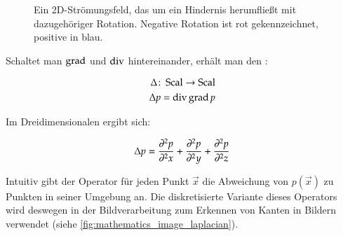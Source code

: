 \begin{figure}
\begin{subfigure}[b]{0.5\textwidth}
	\end{subfigure}
	\caption{Ein 2D-Strömungsfeld, das um ein Hindernis herumfließt mit dazugehöriger Rotation. Negative Rotation ist rot gekennzeichnet, positive in blau.}
    \label{fig:mathematics_rotation_example}
\end{figure}

Schaltet man $\operatorname*{grad}$ und $\operatorname*{div}$ hintereinander, erhält man den
:

\begin{equation}
\begin{aligned}
\Delta \colon \operatorname*{Scal} \to \operatorname*{Scal} \\
\Delta p = \operatorname*{div} \operatorname*{grad} p
\end{aligned}
\end{equation}

Im Dreidimensionalen ergibt sich:

\begin{equation}
\Delta p =
\frac{\partial^2 p}{\partial^2 x} +
\frac{\partial^2 p}{\partial^2 y} +
\frac{\partial^2 p}{\partial^2 z}
\end{equation}

Intuitiv gibt der Operator für jeden Punkt $\vec{x}$ die Abweichung von
$p(\vec{x})$ zu Punkten in seiner Umgebung an. Die diskretisierte Variante dieses
Operators wird deswegen in der Bildverarbeitung zum Erkennen von Kanten in
Bildern verwendet (siehe \cref{fig:mathematics_image_laplacian}).


